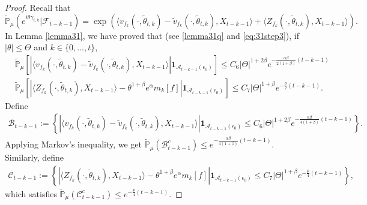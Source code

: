 \documentclass[12pt, a4paper]{amsart}
\theoremstyle{definition}
\numberwithin{equation}{section}
\begin{document}
\begin{proof}
    Recall that
    $$\mathbb{\tilde{P}}_{\mu}\left(e^{i\theta \gamma_{t,k}}|\mathcal{F}_{t-k-1}\right)=\exp(\langle v_{f_k}(\cdot,\tilde{\theta}_{t,k})-\tilde{v}_{f_k}(\cdot, \tilde{\theta}_{t,k}),X_{t-k-1}\rangle+\langle Z_{f_k}(\cdot,\tilde{\theta}_{t,k}),X_{t-k-1}\rangle).$$
    In Lemma \ref{lemma31}, we have proved that (see \eqref{lemma31q} and \eqref{eq:31step3}), if $|\theta|\leq\Theta$ and $k\in\{0,...,t\}$,
    \begin{align*}
        &\mathbb{\tilde{P}}_{\mu}\left[\left|\langle v_{f_k}(\cdot,\tilde{\theta}_{t,k})-\tilde{v}_{f_k}(\cdot,\tilde{\theta}_{t,k}), X_{t-k-1}\rangle\right|\mathbf{1}_{\mathcal{A}_{t-k-1}(\epsilon_0)}\right]\leq C_{6}|\Theta|^{1+2\beta} e^{-\frac{\alpha\beta}{2(1+\beta)}(t-k-1)}\\
        &\mathbb{\tilde{P}}_{\mu}\left[\left|\langle Z_{f_k}(\cdot,\tilde{\theta}_{t,k}),X_{t-k-1}\rangle-\theta^{1+\beta}e^{\alpha}m_k[f]\right|\mathbf{1}_{\mathcal{A}_{t-k-1}(\epsilon_0)}\right]\leq C_7|\Theta|^{1+\beta} e^{-\frac{p}{2}(t-k-1)}.
    \end{align*}
 Define
\begin{align*}
    \mathcal{B}_{t-k-1}:=\left\{\left|\langle v_{f_k}(\cdot,\tilde{\theta}_{t,k})-\tilde{v}_{f_k}(\cdot,\tilde{\theta}_{t,k}), X_{t-k-1}\rangle\right|\mathbf{1}_{\mathcal{A}_{t-k-1}(\epsilon_0)}\leq C_6|\Theta|^{1+2\beta} e^{-\frac{\alpha\beta}{4(1+\beta)}(t-k-1)}\right\}.
\end{align*}
Applying Markov's inequality, we get $\mathbb{\tilde{P}}_{\mu}(\mathcal{B}^c_{t-k-1})\leq e^{-\frac{\alpha\beta}{4(1+\beta)}(t-k-1)}$. Similarly, define
\begin{align*}
    \mathcal{C}_{t-k-1}:=\left\{\left|\langle Z_{f_k}(\cdot,\tilde{\theta}_{t,k}),X_{t-k-1}\rangle-\theta^{1+\beta}e^{\alpha}m_k[f]\right|\mathbf{1}_{\mathcal{A}_{t-k-1}(\epsilon_0)}\leq C_7|\Theta|^{1+\beta} e^{-\frac{p}{4}(t-k-1)}\right\},
\end{align*}
 which satisfies  $\mathbb{\tilde{P}}_{\mu}(\mathcal{C}^c_{t-k-1})\leq e^{-\frac{p}{4}(t-k-1)}$.


\end{proof}
\end{document}
